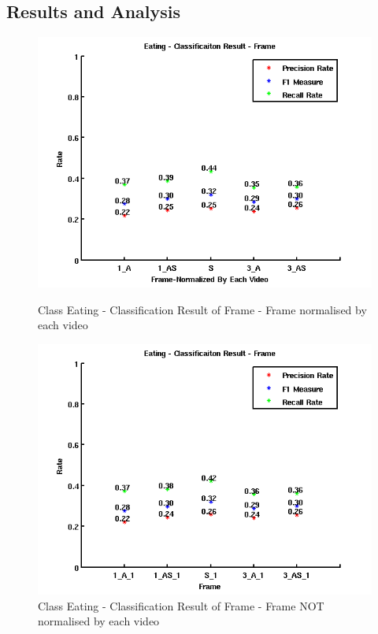 \subsection{Results and Analysis}
\begin{figure}[ht]
\centering
\begin{minipage}{.5\textwidth}
  \centering
  \captionsetup{justification=centering, margin=1cm}
  \includegraphics[width=\linewidth]{imgs/Result_Eating_Frame.png}
  \caption{Class Eating - Classification Result of Frame - Frame normalised by each video}
  \label{fig:REF}
\end{minipage}%
\begin{minipage}{.5\textwidth}
  \centering
  \captionsetup{justification=centering, margin=1cm}
  \includegraphics[width=\linewidth]{imgs/Result_Eating_Frame_1.png}
  \caption{Class Eating - Classification Result of Frame - Frame NOT normalised by each video}
  \label{fig:REF1}
\end{minipage}
\end{figure}
